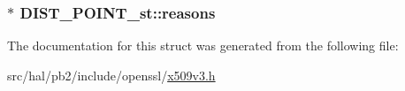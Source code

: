 \subsubsection[{\texorpdfstring{reasons}{reasons}}]{$\ast$ D\+I\+S\+T\+\_\+\+P\+O\+I\+N\+T\+\_\+st\+::reasons}\hypertarget{struct_d_i_s_t___p_o_i_n_t__st_adadc29440678f7d0df1f8fb9319ba87c}{}\label{struct_d_i_s_t___p_o_i_n_t__st_adadc29440678f7d0df1f8fb9319ba87c}


The documentation for this struct was generated from the following file\+:\begin{DoxyCompactItemize}
\item 
src/hal/pb2/include/openssl/\hyperlink{x509v3_8h}{x509v3.\+h}\end{DoxyCompactItemize}
